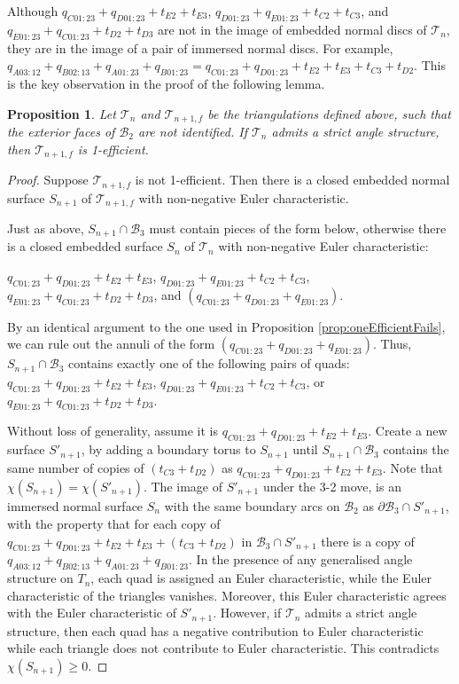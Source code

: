 \documentclass[12pt,reqno]{amsart}  %
\newtheorem{prop}[thm]{Proposition}
\theoremstyle{definition}
\theoremstyle{remark}
\newcommand{\T}{\mathcal{T}}
\def\BTwo{\mathcal{B}_2}
\def\BThree{\mathcal{B}_3}
\begin{document}
Although $q_{C01:23}+q_{D01:23}+t_{E2}+t_{E3}$, 
$q_{D01:23}+q_{E01:23}+t_{C2}+t_{C3}$, and $q_{E01:23}+q_{C01:23}+t_{D2}+t_{D3}$ 
are not in the image of embedded normal discs of $\T_n$, they are in the 
image of a pair of immersed normal discs. For example,
$q_{A03:12} + q_{B02:13}+q_{A01:23} + q_{B01:23}=
q_{C01:23}+q_{D01:23}+t_{E2}+t_{E3}+t_{C3}+t_{D2}$. This is the key observation 
in the proof of the following lemma.

\begin{prop}
\label{prop:strictAngToOneEff}
Let $\T_n$ and $\T_{n+1,f}$ be the triangulations defined above, such that 
the exterior faces of $\BTwo$ are not identified.
If $\T_n$ admits a strict angle structure, then $\T_{n+1,f}$ is 1-efficient. 
\end{prop}

\begin{proof}
Suppose $\T_{n+1,f}$ is not 1-efficient. Then there is a closed embedded 
normal surface $S_{n+1}$ of $\T_{n+1,f}$ with non-negative Euler characteristic. 

Just as above, $S_{n+1} \cap \BThree$ must contain pieces of the form below, 
otherwise there is a closed embedded surface $S_n$ of $\T_n$ with 
non-negative Euler characteristic:

$q_{C01:23}+q_{D01:23}+t_{E2}+t_{E3}$,
$q_{D01:23}+q_{E01:23}+t_{C2}+t_{C3}$, 
$q_{E01:23}+q_{C01:23}+t_{D2}+t_{D3}$,
and $(q_{C01:23}+q_{D01:23}+q_{E01:23})$.

By an identical argument to the one used in 
Proposition \ref{prop:oneEfficientFails}, we can rule out the annuli of 
the form  $(q_{C01:23}+q_{D01:23}+q_{E01:23})$. Thus, $S_{n+1} \cap \BThree$ 
contains exactly one of the following pairs of quads:
$q_{C01:23}+q_{D01:23}+t_{E2}+t_{E3}$,
$q_{D01:23}+q_{E01:23}+t_{C2}+t_{C3}$, or 
$q_{E01:23}+q_{C01:23}+t_{D2}+t_{D3}$.
 
Without loss of generality, assume it is $q_{C01:23}+q_{D01:23}+t_{E2}+t_{E3}$. 
Create a new surface $S'_{n+1}$, by adding a boundary torus to $S_{n+1}$ until 
$S_{n+1} \cap \BThree$ contains the same number of copies of $(t_{C3}+t_{D2})$ 
as $q_{C01:23}+q_{D01:23}+t_{E2}+t_{E3}$. Note that $\chi(S_{n+1})=\chi(S'_{n+1})$. 
The image of $S'_{n+1}$ under the 3-2 move, is an immersed normal surface 
$S_n$ with the same boundary arcs on 
$\BTwo$ as $\partial \BThree \cap S'_{n+1}$, with the property that for 
each copy of $q_{C01:23}+q_{D01:23}+t_{E2}+t_{E3} + (t_{C3}+t_{D2})$ in 
$\BThree \cap S'_{n+1}$ there is a copy of 
$q_{A03:12} + q_{B02:13}+q_{A01:23} + q_{B01:23}$. In the presence of any 
generalised angle structure on $T_n$, each quad is assigned an Euler 
characteristic, while the Euler characteristic of the triangles vanishes. 
Moreover, this Euler characteristic agrees with the Euler characteristic 
of $S'_{n+1}$. However, if $\T_n$ admits a strict angle structure, then 
each quad has a negative contribution to Euler characteristic while 
each triangle does not contribute to Euler characteristic. This contradicts 
$\chi(S_{n+1})\geq 0.$
\end{proof}
\end{document}
